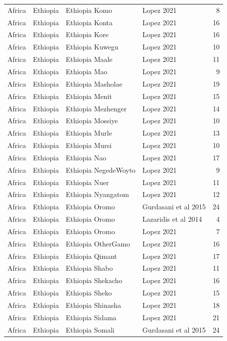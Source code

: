 \begin{longtable}[t]{lll>{\raggedright\arraybackslash}p{9em}r}
Africa & Ethiopia & Ethiopia Komo & Lopez 2021 & 8\\
Africa & Ethiopia & Ethiopia Konta & Lopez 2021 & 16\\
Africa & Ethiopia & Ethiopia Kore & Lopez 2021 & 16\\
Africa & Ethiopia & Ethiopia Kuwegu & Lopez 2021 & 10\\
Africa & Ethiopia & Ethiopia Maale & Lopez 2021 & 11\\
Africa & Ethiopia & Ethiopia Mao & Lopez 2021 & 9\\
Africa & Ethiopia & Ethiopia Masholae & Lopez 2021 & 19\\
Africa & Ethiopia & Ethiopia Menit & Lopez 2021 & 15\\
Africa & Ethiopia & Ethiopia Mezhenger & Lopez 2021 & 14\\
Africa & Ethiopia & Ethiopia Mossiye & Lopez 2021 & 10\\
Africa & Ethiopia & Ethiopia Murle & Lopez 2021 & 13\\
Africa & Ethiopia & Ethiopia Mursi & Lopez 2021 & 10\\
Africa & Ethiopia & Ethiopia Nao & Lopez 2021 & 17\\
Africa & Ethiopia & Ethiopia NegedeWoyto & Lopez 2021 & 9\\
Africa & Ethiopia & Ethiopia Nuer & Lopez 2021 & 11\\
\addlinespace
Africa & Ethiopia & Ethiopia Nyangatom & Lopez 2021 & 12\\
Africa & Ethiopia & Ethiopia Oromo & Gurdasani et al 2015 & 24\\
Africa & Ethiopia & Ethiopia Oromo & Lazaridis et al 2014 & 4\\
Africa & Ethiopia & Ethiopia Oromo & Lopez 2021 & 7\\
Africa & Ethiopia & Ethiopia OtherGamo & Lopez 2021 & 16\\
\addlinespace
Africa & Ethiopia & Ethiopia Qimant & Lopez 2021 & 17\\
Africa & Ethiopia & Ethiopia Shabo & Lopez 2021 & 11\\
Africa & Ethiopia & Ethiopia Shekacho & Lopez 2021 & 16\\
Africa & Ethiopia & Ethiopia Sheko & Lopez 2021 & 15\\
Africa & Ethiopia & Ethiopia Shinasha & Lopez 2021 & 18\\
\addlinespace
Africa & Ethiopia & Ethiopia Sidama & Lopez 2021 & 21\\
Africa & Ethiopia & Ethiopia Somali & Gurdasani et al 2015 & 24\\

\end{longtable}
